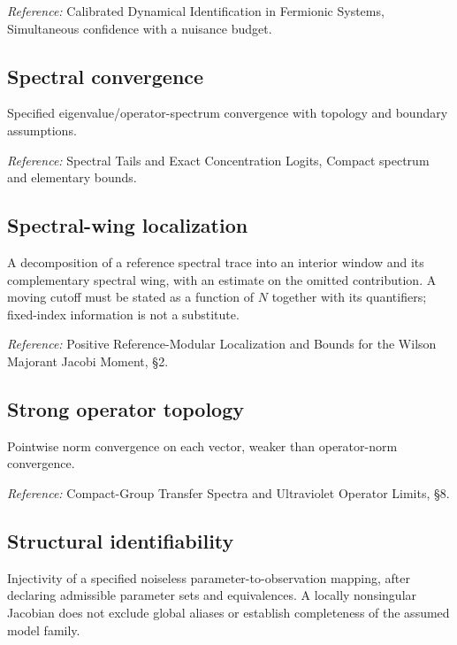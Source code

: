 \documentclass[
  10pt,
  a4paper,
]{article}
\begin{document}
\emph{Reference:} Calibrated Dynamical Identification in Fermionic Systems, Simultaneous confidence with a nuisance budget.

\subsection{Spectral convergence}\label{spectral-convergence}

Specified eigenvalue/operator-spectrum convergence with topology and boundary assumptions.

\nopagebreak[4]

\emph{Reference:} Spectral Tails and Exact Concentration Logits, Compact spectrum and elementary bounds.

\subsection{Spectral-wing localization}\label{spectral-wing-localization}

A decomposition of a reference spectral trace into an interior window and its complementary spectral wing, with an estimate on the omitted contribution. A moving cutoff must be stated as a function of \(N\) together with its quantifiers; fixed-index information is not a substitute.

\nopagebreak[4]

\emph{Reference:} Positive Reference-Modular Localization and Bounds for the Wilson Majorant Jacobi Moment, §2.

\subsection{Strong operator topology}\label{strong-operator-topology}

Pointwise norm convergence on each vector, weaker than operator-norm convergence.

\nopagebreak[4]

\emph{Reference:} Compact-Group Transfer Spectra and Ultraviolet Operator Limits, §8.

\subsection{Structural identifiability}\label{structural-identifiability}

Injectivity of a specified noiseless parameter-to-observation mapping, after declaring admissible parameter sets and equivalences. A locally nonsingular Jacobian does not exclude global aliases or establish completeness of the assumed model family.
\end{document}
